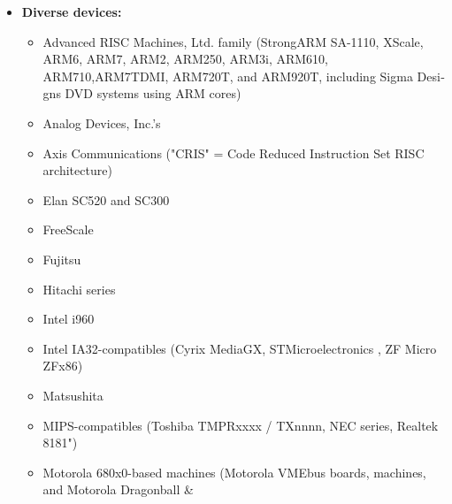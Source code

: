 

\begin{latin}
\begin{itemize}
	\item {\bfseries Diverse  devices:}
	\begin{itemize}
		\item Advanced RISC Machines, Ltd.  family (StrongARM SA-1110, XScale, ARM6, ARM7, ARM2, ARM250, ARM3i, ARM610, ARM710,ARM7TDMI, ARM720T, and ARM920T, including Sigma Designs DVD systems using ARM cores)
		\item Analog Devices, Inc.'s 
		\item Axis Communications 
			("CRIS" = Code Reduced Instruction Set RISC architecture)
		\item Elan SC520 and SC300
		\item FreeScale 
		\item Fujitsu 
		\item Hitachi  series
		\item Intel i960
		\item Intel IA32-compatibles (Cyrix MediaGX, STMicroelectronics , ZF Micro ZFx86)
		\item Matsushita 
		\item MIPS-compatibles (Toshiba TMPRxxxx / TXnnnn, NEC  series, Realtek 8181")
		\item Motorola 680x0-based machines (Motorola VMEbus boards, 
			 machines, and Motorola Dragonball \& 

\end{itemize}
\end{itemize}
\end{latin}
